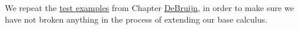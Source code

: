 We repeat the \protect\hyperlink{DeBruijn-examples}{test examples} from
Chapter \protect\hyperlink{DeBruijn}{DeBruijn}, in order to make sure we
have not broken anything in the process of extending our base calculus.

\begin{fence}
\begin{code}%
\>[0]\AgdaSpace{}%
\AgdaSymbol{:}\AgdaSpace{}%
\AgdaSpace{}%
\AgdaSymbol{\{}\AgdaSymbol{\}}\AgdaSpace{}%
\AgdaSpace{}%
\AgdaSpace{}%
\AgdaSpace{}%
\<%
\\
\>[0]\AgdaSpace{}%
\AgdaSymbol{=}\AgdaSpace{}%
\AgdaSpace{}%
\AgdaSpace{}%
\<%
\\
%
\\[\AgdaEmptyExtraSkip]%
\>[0]\AgdaSpace{}%
\AgdaSymbol{:}\AgdaSpace{}%
\AgdaSpace{}%
\AgdaSymbol{\{}\AgdaSymbol{\}}\AgdaSpace{}%
\AgdaSpace{}%
\AgdaSpace{}%
\AgdaSpace{}%
\AgdaSpace{}%
\AgdaSpace{}%
\AgdaSpace{}%
\AgdaSpace{}%
\<%
\\
\>[0]\AgdaSpace{}%
\AgdaSymbol{=}\AgdaSpace{}%
\AgdaSpace{}%
\AgdaSpace{}%
\AgdaSpace{}%
\AgdaSymbol{(}\AgdaSpace{}%
\AgdaSymbol{(}\AgdaOperator{\AgdaFunction{\#}}\AgdaSpace{}%
\AgdaSymbol{)}\AgdaSpace{}%
\AgdaSymbol{(}\AgdaOperator{\AgdaFunction{\#}}\AgdaSpace{}%
\AgdaSymbol{)}\AgdaSpace{}%
\AgdaSymbol{(}\AgdaSpace{}%
\AgdaSymbol{(}\AgdaOperator{\AgdaFunction{\#}}\AgdaSpace{}%
\AgdaSpace{}%
\AgdaSpace{}%
\AgdaOperator{\AgdaFunction{\#}}\AgdaSpace{}%
\AgdaSpace{}%
\AgdaSpace{}%
\AgdaOperator{\AgdaFunction{\#}}\AgdaSpace{}%
\AgdaSymbol{)))}\<%
\\
%
\\[\AgdaEmptyExtraSkip]%
\>[0]\AgdaSpace{}%

\end{code}
\end{fence}

